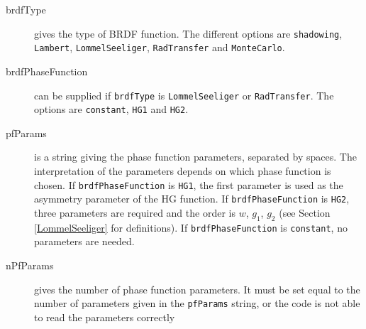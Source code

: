 \documentclass[a4paper]{article}
\newcommand{\code}[1]{\lstinline{#1}}
\begin{document}
\begin{description}
	\item[brdfType] gives the type of BRDF function. The different options are \code{shadowing}, \code{Lambert}, \code{LommelSeeliger}, \code{RadTransfer} and \code{MonteCarlo}. %
	\item[brdfPhaseFunction] can be supplied if \code{brdfType} is \code{LommelSeeliger} or \code{RadTransfer}. The options are \code{constant}, \code{HG1} and \code{HG2}. %
	\item[pfParams] is a string giving the phase function parameters, separated by spaces. The interpretation of the parameters depends on which phase function is chosen. If \code{brdfPhaseFunction} is \code{HG1}, the first parameter is used as the asymmetry parameter of the HG function. If \code{brdfPhaseFunction} is \code{HG2}, three parameters are required and the order is $w$, $g_1$, $g_2$ (see Section \ref{LommelSeeliger} for definitions). If \code{brdfPhaseFunction} is \code{constant}, no parameters are needed.
	\item[nPfParams] gives the number of phase function parameters. It must be set equal to the number of parameters given in the \code{pfParams} string, or the code is not able to read the parameters correctly
	

\end{description}
\end{document}
